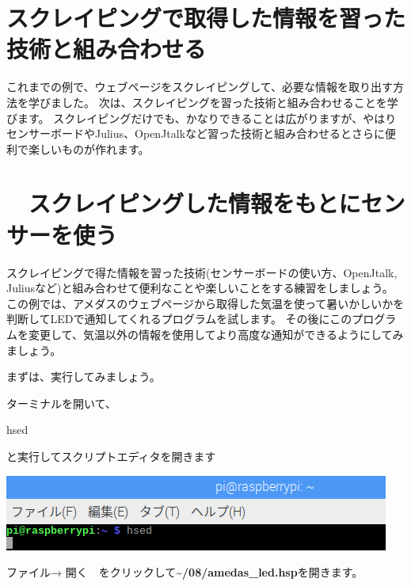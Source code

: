 
\clearpage\section{スクレイピングで取得した情報を習った技術と組み合わせる}
これまでの例で、ウェブページをスクレイピングして、必要な情報を取り出す方法を学びました。
次は、スクレイピングを習った技術と組み合わせることを学びます。
スクレイピングだけでも、かなりできることは広がりますが、やはりセンサーボードやJulius、OpenJtalkなど習った技術と組み合わせるとさらに便利で楽しいものが作れます。

\clearpage\section{\theExercise　スクレイピングした情報をもとにセンサーを使う}
\addtocounter{Exercise}{-1}\label{E:amedasSensor}
スクレイピングで得た情報を習った技術(センサーボードの使い方、OpenJtalk,
Juliusなど)と組み合わせて便利なことや楽しいことをする練習をしましょう。
この例では、アメダスのウェブページから取得した気温を使って暑いかしいかを判断してLEDで通知してくれるプログラムを試します。
その後にこのプログラムを変更して、気温以外の情報を使用してより高度な通知ができるようにしてみましょう。

まずは、実行してみましょう。

ターミナルを開いて、

hsed

と実行してスクリプトエディタを開きます

\begin{center}
\includegraphics[width=\textwidth]{./text08-img/textbook-img013.png}

\end{center}
ファイル→
開く　をクリックして\textbf{{\textasciitilde}/08/amedas\_led.hsp}を開きます。

